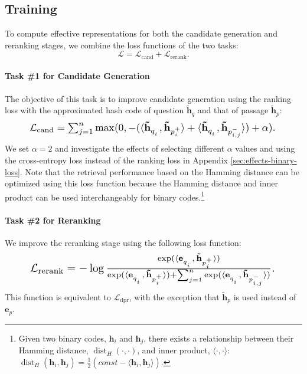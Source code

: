 \documentclass[11pt,a4paper]{article}
\DeclareMathOperator{\dist}{dist}
\begin{document}
\subsection{Training}
\label{subsec:training}
To compute effective representations for both the candidate generation and reranking stages, we combine the loss functions of the two tasks:
\begin{equation}
  \mathcal{L} = \mathcal{L}_{\text{cand}} + \mathcal{L}_{\text{rerank}}.
\end{equation}

\paragraph{Task \#1 for Candidate Generation}
The objective of this task is to improve candidate generation using the ranking loss with the approximated hash code of question $\mathbf{\tilde{h}}_q$ and that of passage $\mathbf{\tilde{h}}_p$:
\begin{equation}
  \resizebox{.89\hsize}{!}{
  $\mathcal{L}_{\text{cand}} = \sum_{j=1}^{n}\max(0, -(\langle \mathbf{\tilde{h}}_{q_i^{\phantom{0}}}, \mathbf{\tilde{h}}_{p_i^+}\rangle + \langle \mathbf{\tilde{h}}_{q_i^{\phantom{0}}}, \mathbf{\tilde{h}}_{p_{i,j}^-}\rangle) + \alpha)$.
  }
  \label{eq:ranking-loss}
\end{equation}
We set $\alpha=2$ and investigate the effects of selecting different $\alpha$ values and using the cross-entropy loss instead of the ranking loss in Appendix \ref{sec:effects-binary-loss}.
Note that the retrieval performance based on the Hamming distance can be optimized using this loss function because the Hamming distance and inner product can be used interchangeably for binary codes.\footnote{Given two binary codes, $\mathbf{h}_i$ and $\mathbf{h}_j$, there exists a relationship between their Hamming distance, $\dist_H(\cdot,\cdot)$, and inner product, $\langle\cdot,\cdot\rangle$: $\dist_H(\mathbf{h}_i, \mathbf{h}_j) = \frac{1}{2}(const - \langle\mathbf{h}_i, \mathbf{h}_j\rangle)$.}

\paragraph{Task \#2 for Reranking}
We improve the reranking stage using the following loss function:
\begin{equation}
  \resizebox{.89\hsize}{!}{
  $\mathcal{L}_{\text{rerank}} = -\log \frac{\exp(\langle \mathbf{e}_{q_i^{\phantom{0}}},\, \mathbf{\tilde{h}}_{p_i^+}\rangle)}{\exp(\langle \mathbf{e}_{q^{\phantom{0}}_i},\, \mathbf{\tilde{h}}_{p_i^+}\rangle) + \sum_{j=1}^n{\exp(\langle \mathbf{e}_{q^{\phantom{0}}_i},\, \mathbf{\tilde{h}}_{p^-_{i,j}}\rangle)}}$.
  }
  \label{eq:reranking-loss}
\end{equation}
This function is equivalent to $\mathcal{L}_{\text{dpr}}$, with the exception that $\mathbf{\tilde{h}}_p$ is used instead of $\mathbf{e}_p$.
\end{document}
